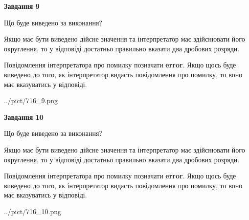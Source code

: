 \documentclass[12pt, ukrainian]{article}
\begin{document}
{\begin {Large}
{\begin {center}\textbf{Завдання 9}\end {center}}\par
Що буде виведено за виконання? \par

Якщо має бути виведено дійсне значення та інтерпретатор має здійснювати його округлення, 
то у відповіді достатньо правильно вказати два дробових розряди.

Повідомлення інтерпретатора про помилку позначати \textbf{error}.
Якщо щось буде виведено до того, як інтерпретатор видасть повідомлення про помилку, 
то воно має вказуватись у відповіді. \par

\begin{center}
	{../pict/716_9.png}
\end{center}
\newpage

{\begin {center}\textbf{Завдання 10}\end {center}}\par
Що буде виведено за виконання? \par

Якщо має бути виведено дійсне значення та інтерпретатор має здійснювати його округлення, 
то у відповіді достатньо правильно вказати два дробових розряди.

Повідомлення інтерпретатора про помилку позначати \textbf{error}.
Якщо щось буде виведено до того, як інтерпретатор видасть повідомлення про помилку, 
то воно має вказуватись у відповіді. \par

\begin{center}
	{../pict/716_10.png}
\end{center}
\newpage

\end {Large}}
\end{document}
